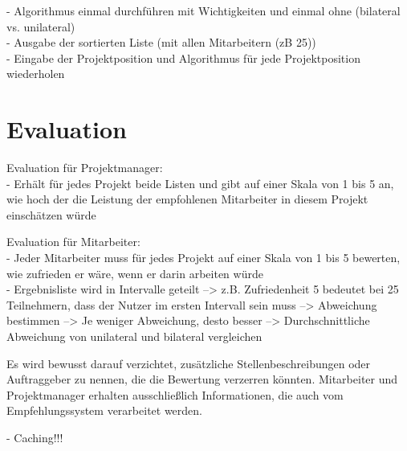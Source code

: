 - Algorithmus einmal durchführen mit Wichtigkeiten und einmal ohne (bilateral vs. unilateral)\\
- Ausgabe der sortierten Liste (mit allen Mitarbeitern (zB 25))\\
- Eingabe der Projektposition und Algorithmus für jede Projektposition wiederholen

\section{Evaluation}
\label{ch:methodik:evaluation}
Evaluation für Projektmanager:\\
- Erhält für jedes Projekt beide Listen und gibt auf einer Skala von 1 bis 5 an, wie hoch der die Leistung der empfohlenen Mitarbeiter in diesem Projekt einschätzen würde

Evaluation für Mitarbeiter:\\
- Jeder Mitarbeiter muss für jedes Projekt auf einer Skala von 1 bis 5 bewerten, wie zufrieden er wäre, wenn er darin arbeiten würde\\
- Ergebnisliste wird in Intervalle geteilt --> z.B. Zufriedenheit 5 bedeutet bei 25 Teilnehmern, dass der Nutzer im ersten Intervall sein muss --> Abweichung bestimmen --> Je weniger Abweichung, desto besser --> Durchschnittliche Abweichung von unilateral und bilateral vergleichen

Es wird bewusst darauf verzichtet, zusätzliche Stellenbeschreibungen oder Auftraggeber zu nennen, die die Bewertung verzerren könnten. Mitarbeiter und Projektmanager erhalten ausschließlich Informationen, die auch vom Empfehlungssystem verarbeitet werden.

- Caching!!!
